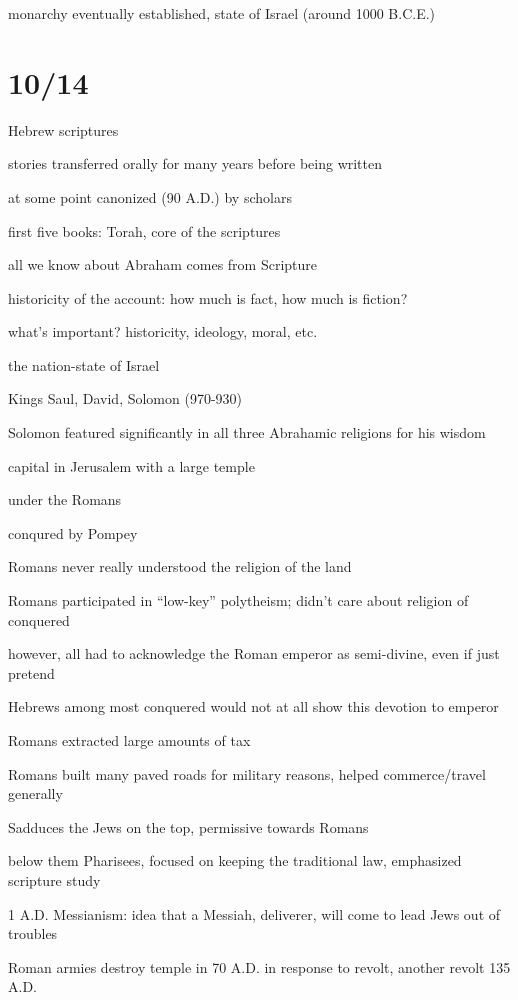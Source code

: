 \documentclass[12pt]{article}
\begin{document}
monarchy eventually established, state of Israel (around 1000 B.C.E.)

\section{10/14}

Hebrew scriptures

stories transferred orally for many years before being written

at some point canonized (90 A.D.) by scholars

first five books: Torah, core of the scriptures

\noindent
all we know about Abraham comes from Scripture

historicity of the account: how much is fact, how much is fiction?

what's important? historicity, ideology, moral, etc.

\noindent
the nation-state of Israel

Kings Saul, David, Solomon (970-930)

Solomon featured significantly in all three Abrahamic religions for his wisdom

capital in Jerusalem with a large temple

\noindent
under the Romans

conqured by Pompey

Romans never really understood the religion of the land

Romans participated in ``low-key'' polytheism; didn't care about religion of conquered

however, all had to acknowledge the Roman emperor as semi-divine, even if just pretend

Hebrews among most conquered would not at all show this devotion to emperor

Romans extracted large amounts of tax

Romans built many paved roads for military reasons, helped commerce/travel generally

Sadduces the Jews on the top, permissive towards Romans

below them Pharisees, focused on keeping the traditional law, emphasized scripture study

1 A.D. Messianism: idea that a Messiah, deliverer, will come to lead Jews out of troubles

Roman armies destroy temple in 70 A.D. in response to revolt, another revolt 135 A.D.
\end{document}

